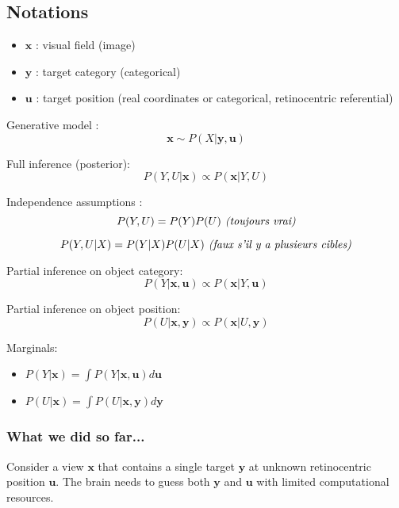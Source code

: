 




\subsection{Notations}
\begin{itemize}
	\item $\boldsymbol{x}$ : visual field (image)
	\item $\boldsymbol{y}$ : target category (categorical)
	\item $\boldsymbol{u}$ : target position (real coordinates or categorical, retinocentric referential)

\end{itemize}

Generative model :
$$ \boldsymbol{x} \sim P(X|\boldsymbol{y}, \boldsymbol{u}) $$

Full inference (posterior):
$$ P(Y, U|\boldsymbol{x}) \propto  P(\boldsymbol{x}|Y, U) $$

Independence assumptions :
\begin{equation}
P(Y, U) = P(Y)  P(U) \text{\emph{ (toujours vrai)}}
\label{eq:indep-1}
\end{equation}

\begin{equation}
P(Y, U|X) = P(Y|X)  P(U|X) \text{\emph{ (faux s'il y a plusieurs cibles)}}
\label{eq:indep-2}
\end{equation}

Partial inference on object category:
$$ P(Y|\boldsymbol{x}, \boldsymbol{u}) \propto  P(\boldsymbol{x}|Y, \boldsymbol{u}) $$

Partial inference on object position:
$$ P(U|\boldsymbol{x}, \boldsymbol{y}) \propto  P(\boldsymbol{x}|U, \boldsymbol{y}) $$

Marginals:
\begin{itemize}
\item $ P(Y|\boldsymbol{x}) = \int P(Y|\boldsymbol{x}, \boldsymbol{u}) d\boldsymbol{u}$
\item $ P(U|\boldsymbol{x}) = \int P(U|\boldsymbol{x}, \boldsymbol{y}) d\boldsymbol{y}$
\end{itemize}

\subsubsection{What we did so far...}

Consider a view $\boldsymbol{x}$ that contains a single target $\boldsymbol{y}$ at unknown retinocentric position $\boldsymbol{u}$. The brain needs to guess both  $\boldsymbol{y}$ and $\boldsymbol{u}$ with limited computational resources.

